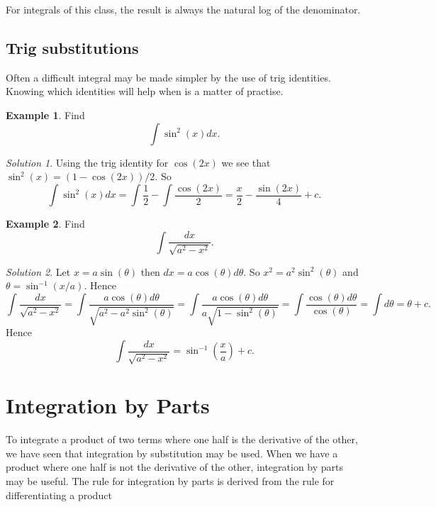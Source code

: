 \documentclass[
  11pt,
  oneside]{book}
\newcommand{\slide}{}
\newcommand{\cpybx}{}
\newcommand{\ecpybx}{}
\theoremstyle{definition}
\theoremstyle{definition}
\newtheorem{example}{Example}[chapter]
\theoremstyle{definition}
\theoremstyle{definition}
\theoremstyle{remark}
\newtheorem*{solution}{Solution}
\begin{document}
For integrals of this class, the result is always the natural log of the denominator.
\slide

\subsection{Trig substitutions}\label{trig-substitutions}

Often a difficult integral may be made simpler by the use of trig identities. Knowing which identities will help when is a matter of practise.

\begin{example}
Find
\[
\int\sin^2(x) dx.
\]
\end{example}

\begin{solution}
Using the trig identity for \(\cos(2x)\) we see that \(\sin^2(x) = (1-\cos(2x))/2\). So
\[
\int\sin^2(x) dx = \int\frac 12-\int\frac{\cos(2x)}{2} = \frac x2-\frac{\sin(2x)}{4}+c.
\]
\end{solution}

\slide

\cpybx

\begin{example}
Find
\[
\int\frac{dx}{\sqrt{a^2-x^2}}.
\]
\end{example}

\ecpybx\slide\copy\copybox

\begin{solution}
Let \(x = a\sin(\theta)\) then \(dx = a\cos(\theta)d\theta\). So \(x^2 = a^2\sin^2(\theta)\) and \(\theta = \sin^{-1}(x/a)\). Hence
\[
\int\frac{dx}{\sqrt{a^2-x^2}} = \int\frac{a\cos(\theta)d\theta}{\sqrt{a^2-a^2\sin^2(\theta)}} = \int\frac{a\cos(\theta)d\theta}{a\sqrt{1-\sin^2(\theta)}} = \int\frac{\cos(\theta)d\theta}{\cos(\theta)} = \int d\theta = \theta + c.
\]
Hence
\[
\int\frac{dx}{\sqrt{a^2-x^2}} = \sin^{-1}\left(\frac xa\right) + c.
\]
\end{solution}

\slide

\section{Integration by Parts}\label{integration-by-parts}

To integrate a product of two terms where one half is the derivative of the other, we have seen that integration by substitution may be used. When we have a product where one half is not the derivative of the other, integration by parts may be useful. The rule for integration by parts is derived from the rule for differentiating a product
\end{document}
